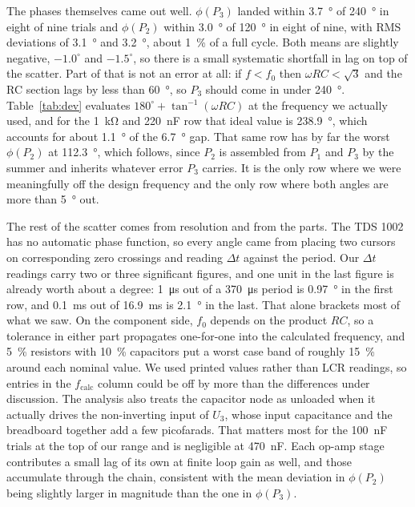 \documentclass[11pt]{article}
\begin{document}
The phases themselves came out well. $\phi(P_3)$ landed within
\qty{3.7}{\degree} of \qty{240}{\degree} in eight of nine trials and $\phi(P_2)$
within \qty{3.0}{\degree} of \qty{120}{\degree} in eight of nine, with RMS
deviations of \qty{3.1}{\degree} and \qty{3.2}{\degree}, about
\qty{1}{\percent} of a full cycle. Both means are slightly negative,
$-1.0^{\circ}$ and $-1.5^{\circ}$, so there is a small systematic shortfall in
lag on top of the scatter. Part of that is not an error at all: if $f < f_0$
then $\omega RC < \sqrt{3}$ and the RC section lags by less than
\qty{60}{\degree}, so $P_3$ should come in under \qty{240}{\degree}.
Table~\ref{tab:dev} evaluates $180^{\circ} + \tan^{-1}(\omega RC)$ at the
frequency we actually used, and for the \qty{1}{\kilo\ohm} and
\qty{220}{\nano\farad} row that ideal value is \qty{238.9}{\degree}, which
accounts for about \qty{1.1}{\degree} of the \qty{6.7}{\degree} gap. That same
row has by far the worst $\phi(P_2)$ at \qty{112.3}{\degree}, which follows,
since $P_2$ is assembled from $P_1$ and $P_3$ by the summer and inherits
whatever error $P_3$ carries. It is the only row where we were meaningfully off
the design frequency and the only row where both angles are more than
\qty{5}{\degree} out.

The rest of the scatter comes from resolution and from the parts. The TDS 1002
has no automatic phase function, so every angle came from placing two cursors on
corresponding zero crossings and reading $\Delta t$ against the period. Our
$\Delta t$ readings carry two or three significant figures, and one unit in the
last figure is already worth about a degree: \qty{1}{\micro\second} out of a
\qty{370}{\micro\second} period is \qty{0.97}{\degree} in the first row, and
\qty{0.1}{\milli\second} out of \qty{16.9}{\milli\second} is \qty{2.1}{\degree}
in the last. That alone brackets most of what we saw. On the component side,
$f_0$ depends on the product $RC$, so a tolerance in either part propagates
one-for-one into the calculated frequency, and \qty{5}{\percent} resistors with
\qty{10}{\percent} capacitors put a worst case band of roughly
\qty{15}{\percent} around each nominal value. We used printed values rather than
LCR readings, so entries in the $f_{\text{calc}}$ column could be off by more
than the differences under discussion. The analysis also treats the capacitor
node as unloaded when it actually drives the non-inverting input of $U_3$, whose
input capacitance and the breadboard together add a few picofarads. That matters
most for the \qty{100}{\nano\farad} trials at the top of our range and is
negligible at \qty{470}{\nano\farad}. Each op-amp stage contributes a small lag
of its own at finite loop gain as well, and those accumulate through the chain,
consistent with the mean deviation in $\phi(P_2)$ being slightly larger in
magnitude than the one in $\phi(P_3)$.
\end{document}
